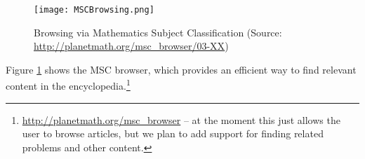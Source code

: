 \documentclass[12pt]{article}
\begin{document}
\begin{figure}[h]
\begin{center}
\texttt{[image: MSCBrowsing.png]}
\end{center}
\caption{Browsing via Mathematics Subject Classification (Source: \url{http://planetmath.org/msc_browser/03-XX})\label{MSCBrowsing}}
\end{figure}

Figure \ref{MSCBrowsing} shows the MSC browser, which provides an efficient way to find relevant content in the encyclopedia.\footnote{\url{http://planetmath.org/msc_browser} -- at the moment this just allows the user to browse articles, but we plan to add support for finding related problems and other content.}

\end{document}
